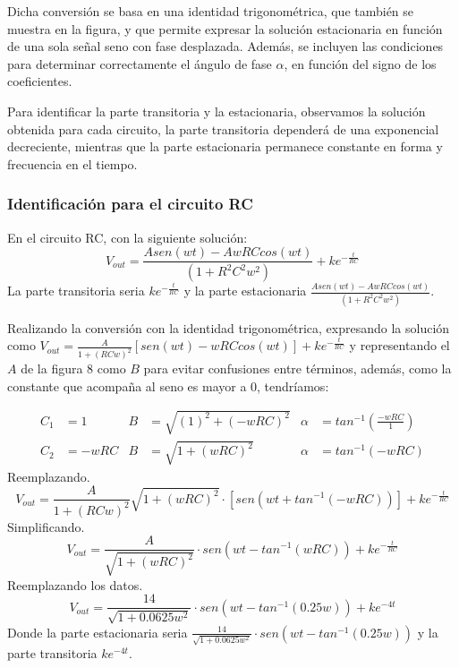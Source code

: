 \documentclass{article}
\begin{document}
Dicha conversión se basa en una identidad trigonométrica, que también se muestra en la figura, y que permite expresar la solución estacionaria en función de una sola señal seno con fase desplazada. Además, se incluyen las condiciones para determinar correctamente el ángulo de fase \(\alpha\), en función del signo de los coeficientes.

Para identificar la parte transitoria y la estacionaria, observamos la solución obtenida para cada circuito, la parte transitoria dependerá de una exponencial decreciente, mientras que la parte estacionaria  permanece constante en forma y frecuencia en el tiempo.
\subsubsection{Identificación para el circuito RC}
En el circuito RC, con la siguiente solución:
\[
    V_{out}=\frac{Asen(wt)-AwRCcos(wt)}{(1+R^2C^2w^2)}+ke^{-\frac{t}{RC}}
\]
La parte transitoria seria \(ke^{-\frac{t}{RC}}\) y la parte estacionaria \(\frac{Asen(wt)-AwRCcos(wt)}{(1+R^2C^2w^2)}\).

Realizando la conversión con la identidad trigonométrica, expresando la solución como \(V_{out}=\frac{A}{1+(RCw)^2}[sen(wt)-wRCcos(wt)]+ke^{-\frac{t}{RC}}\) y representando el \(A\) de la figura 8 como \(B\) para evitar confusiones entre términos, además, como la constante que acompaña al seno es mayor a 0, tendríamos:

\begin{align*}
    C_1&=1
    &B&=\sqrt{(1)^2+(-wRC)^2}
    &\alpha&=tan^{-1}(\frac{-wRC}{1})\\
    C_2&=-wRC
    &B&=\sqrt{1+(wRC)^2}
    &\alpha&=tan^{-1}(-wRC)
\end{align*}
Reemplazando.
\[
    V_{out}=\frac{A}{1+(RCw)^2}\sqrt{1+(wRC)^2}\cdot[sen(wt+tan^{-1}(-wRC))]+ke^{-\frac{t}{RC}}
\]
Simplificando.
\[
    V_{out}=\frac{A}{\sqrt{1+(wRC)^2}}\cdot sen(wt-tan^{-1}(wRC))+ke^{-\frac{t}{RC}}
\]
Reemplazando los datos.
\[
    V_{out}=\frac{14}{\sqrt{1+0.0625w^2}}\cdot sen(wt-tan^{-1}(0.25w))+ke^{-4t}
\]
Donde la parte estacionaria seria \(\frac{14}{\sqrt{1+0.0625w^2}}\cdot sen(wt-tan^{-1}(0.25w))\) y la parte transitoria \(ke^{-4t}\).
\end{document}
